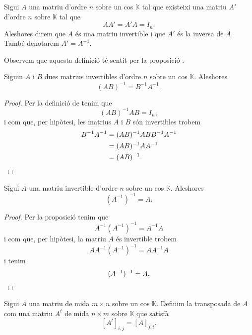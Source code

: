 \documentclass[../Apunts.tex]{subfiles}
\begin{document}
	\begin{definition}
		\label{def:matriu invertible}
		\label{def:inversa d'una matriu}
		Sigui \(A\) una matriu d'ordre \(n\) sobre un cos \(\mathbb{K}\) tal que existeixi una matriu \(A'\) d'ordre \(n\) sobre \(\mathbb{K}\) tal que
		\[AA'=A'A=I_{n}.\]
		Aleshores direm que \(A\) és una matriu invertible i que \(A'\) és la inversa de \(A\). També denotarem \(A'=A^{-1}\).
		
		Observem que aquesta definició té sentit per la proposició .
	\end{definition}
	\begin{proposition}
		\label{prop:inversa del producte de matrius}
		Siguin \(A\) i \(B\) dues matrius invertibles d'ordre \(n\) sobre un cos \(\mathbb{K}\). Aleshores
		\[(AB)^{-1}=B^{-1}A^{-1}.\]
		\begin{proof}
			Per la definició de  tenim que
			\[(AB)^{-1}AB=I_{n},\]
			i com que, per hipòtesi, les matrius \(A\) i \(B\) són invertibles trobem
			\begin{align*}
			B^{-1}A^{-1}&=(AB)^{-1}ABB^{-1}A^{-1}\\
			&=(AB)^{-1}AA^{-1}\\
			&=(AB)^{-1}.\qedhere
			\end{align*}
		\end{proof}
	\end{proposition}
	\begin{proposition}
		\label{prop:inversa de l'inversa d'una matriu és la matriu}
		Sigui \(A\) una matriu invertible d'ordre \(n\) sobre un cos \(\mathbb{K}\). Aleshores
		\[(A^{-1})^{-1}=A.\]
		\begin{proof}
			Per la proposició  tenim que
			\[A^{-1}(A^{-1})^{-1}=A^{-1}A\]
			i com que, per hipòtesi, la matriu \(A\) és invertible trobem
			\[AA^{-1}(A^{-1})^{-1}=AA^{-1}A\]
			i tenim
			\[(A^{-1})^{-1}=A.\qedhere\]
		\end{proof}
	\end{proposition}
	\begin{definition}
		\label{def:matriu transposada}
		\label{def:transposició d'una matriu}
		Sigui \(A\) una matriu de mida \(m\times n\) sobre un cos \(\mathbb{K}\). Definim la transposada de \(A\) com una matriu \(A^{t}\) de mida \(n\times m\) sobre \(\mathbb{K}\) que satisfà
		\[[A^{t}]_{i,j}=[A]_{j,i}.\]
	\end{definition}
\end{document}

